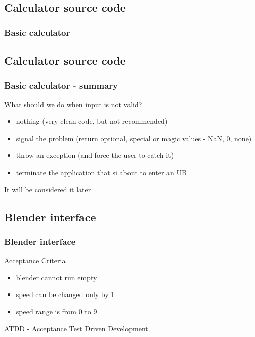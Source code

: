 \documentclass{beamer}
\begin{document}
\subsection{Calculator source code}
\begin{frame}[fragile]
\frametitle{Basic calculator}
\end{frame}

\subsection{Calculator source code}
\begin{frame}[fragile]
\frametitle{Basic calculator - summary}
What should we do when input is not valid?
\pause
\begin{itemize}[<+->]
  \item nothing (very clean code, but not recommended)
  \item signal the problem (return optional, special or magic values - NaN, 0, none)
  \item throw an exception (and force the user to catch it)
  \item terminate the application that si about to enter an UB
\end{itemize}
\pause
\begin{block}{}
It will be considered it later
\end{block}
\end{frame}

\subsection{Blender interface}
\begin{frame}
\frametitle{Blender interface}
Acceptance Criteria
\begin{itemize}
  \item blender cannot run empty
  \item speed can be changed only by 1
  \item speed range is from 0 to 9 
\end{itemize}
\pause
\begin{block}{}
ATDD - Acceptance Test Driven Development
\end{block}
\end{frame}
\end{document}
